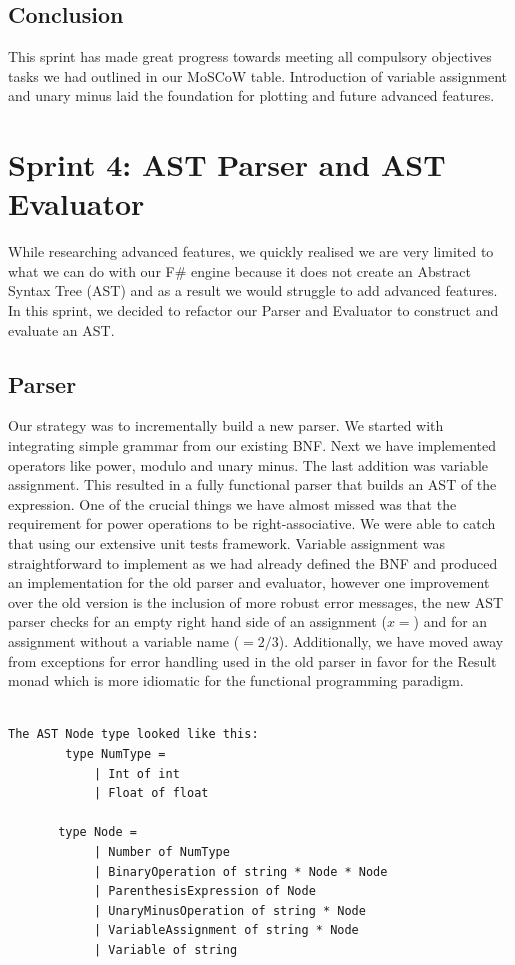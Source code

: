 \documentclass[a4paper, oneside, 11pt]{report}
\begin{document}
\subsection{Conclusion}
This sprint has made great progress towards meeting all compulsory objectives tasks we had outlined in our MoSCoW table. Introduction of variable assignment and unary minus laid the foundation for plotting and future advanced features.



\section{Sprint 4: AST Parser and AST Evaluator}
While researching advanced features, we quickly realised we are very limited to what we can do with our F\# engine because it does not create an Abstract Syntax Tree (AST) and as a result we would struggle to add advanced features. In this sprint, we decided to refactor our Parser and Evaluator to construct and evaluate an AST.

\subsection{Parser}
Our strategy was to incrementally build a new parser. We started with integrating simple grammar from our existing BNF. Next we have implemented operators like power, modulo and unary minus. The last addition was variable assignment. This resulted in a fully functional parser that builds an AST of the expression. One of the crucial things we have almost missed was that the requirement for power operations to be right-associative. We were able to catch that using our extensive unit tests framework.
Variable assignment was straightforward to implement as we had already defined the BNF and produced an implementation for the old parser and evaluator, however one improvement over the old version is the inclusion of more robust error messages, the new AST parser checks for an empty right hand side of an assignment ($x = $) and for an assignment without a variable name ($= 2/3$). Additionally, we have moved away from exceptions for error handling used in the old parser in favor for the Result monad which is more idiomatic for the functional programming paradigm.
\begin{verbatim}
    
The AST Node type looked like this:
        type NumType =
            | Int of int
            | Float of float

       type Node =
            | Number of NumType
            | BinaryOperation of string * Node * Node
            | ParenthesisExpression of Node
            | UnaryMinusOperation of string * Node
            | VariableAssignment of string * Node
            | Variable of string
\end{verbatim}
\end{document}
